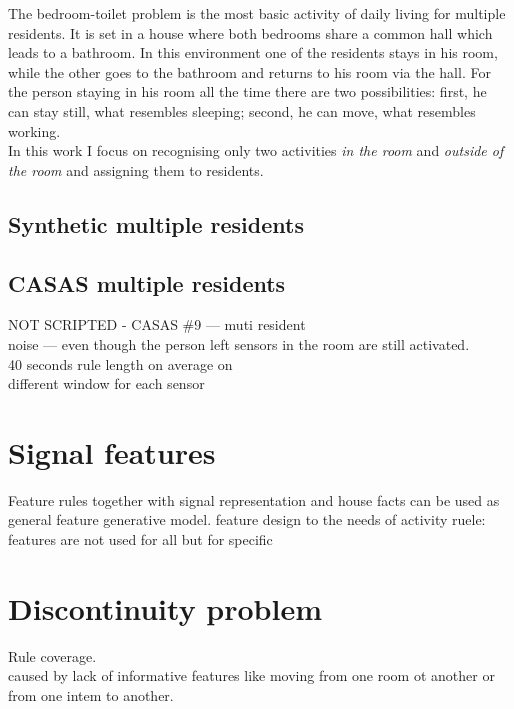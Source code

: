 \documentclass[11pt, a4paper, pdflatex, leqno, twoside, openright]{report}
\begin{document}
The bedroom-toilet problem is the most basic activity of daily living for multiple residents. It is set in a house where both bedrooms share a common hall which leads to a bathroom. In this environment one of the residents stays in his room, while the other goes to the bathroom and returns to his room via the hall. For the person staying in his room all the time there are two possibilities: first, he can stay still, what resembles sleeping; second, he can move, what resembles working.\\

In this work I focus on recognising only two activities \emph{in the room} and \emph{outside of the room} and assigning them to residents.

    \subsection{Synthetic multiple residents}
    \subsection{CASAS multiple residents}
NOT SCRIPTED - CASAS \#9 --- muti resident\\
noise --- even though the person left sensors in the room are still activated.\\
40 seconds rule length on average on\\
different window for each sensor


  \section{Signal features\label{sec:single:features}\label{sec:multiple:features}}
Feature rules together with signal representation and house facts can be used as general feature generative model.
feature design to the needs of activity ruele: features are not used for all but for specific

  \section{Discontinuity problem\label{sec:predictionDiscontinuity}}
Rule coverage.\\
caused by lack of informative features like moving from one room ot another or from one intem to another.
\end{document}
